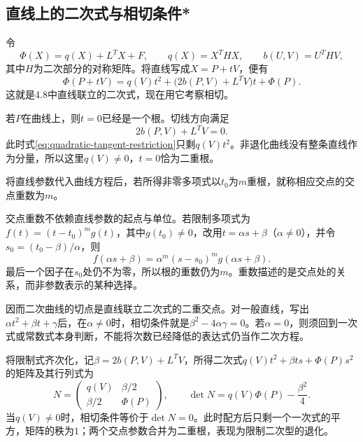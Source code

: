 \newpage
\subsection{直线上的二次式与相切条件*}
\label{subsec:quadratic-tangency-and-quadratic-forms}

令
\begin{equation*}
 \Phi(X)=q(X)+L^TX+F,\qquad q(X)=X^THX,\qquad b(U,V)=U^THV,
\end{equation*}
其中\(H\)为二次部分的对称矩阵。将直线写成\(X=P+tV\)，便有
\begin{equation}\label{eq:quadratic-tangent-restriction}
 \Phi(P+tV)=q(V)t^2+\bigl(2b(P,V)+L^TV\bigr)t+\Phi(P).
\end{equation}
这就是4.8中直线联立的二次式，现在用它考察相切。

若\(P\)在曲线上，则\(t=0\)已经是一个根。切线方向满足
\begin{equation}\label{eq:quadratic-tangent-direction-bilinear}
 2b(P,V)+L^TV=0.
\end{equation}
此时式\eqref{eq:quadratic-tangent-restriction}只剩\(q(V)t^2\)。非退化曲线没有整条直线作为分量，所以这里\(q(V)\ne0\)，\(t=0\)恰为二重根。

\begin{definition}
将直线参数代入曲线方程后，若所得非零多项式以\(t_0\)为\(m\)重根，就称相应交点的{\heiti{}交点重数}为\(m\)。
\end{definition}

交点重数不依赖直线参数的起点与单位。若限制多项式为\(f(t)=(t-t_0)^mg(t)\)，其中\(g(t_0)\ne0\)，改用\(t=\alpha s+\beta\)（\(\alpha\ne0\)），并令\(s_0=(t_0-\beta)/\alpha\)，则
\begin{equation*}
 f(\alpha s+\beta)=\alpha^m(s-s_0)^m g(\alpha s+\beta).
\end{equation*}
最后一个因子在\(s_0\)处仍不为零，所以根的重数仍为\(m\)。重数描述的是交点处的关系，而非参数表示的某种选择。

因而二次曲线的切点是直线联立二次式的二重交点。对一般直线，写出\(\alpha t^2+\beta t+\gamma\)后，在\(\alpha\ne0\)时，相切条件就是\(\beta^2-4\alpha\gamma=0\)。若\(\alpha=0\)，则须回到一次式或常数式本身判断，不能将次数已经降低的表达式仍当作二次方程。

将限制式齐次化，记\(\beta=2b(P,V)+L^TV\)，所得二次式\(q(V)t^2+\beta ts+\Phi(P)s^2\)的矩阵及其行列式为
\begin{equation*}
 N=\begin{pmatrix}q(V)&\beta/2\\\beta/2&\Phi(P)\end{pmatrix},
 \qquad \det N=q(V)\Phi(P)-\frac{\beta^2}{4}.
\end{equation*}
当\(q(V)\ne0\)时，相切条件等价于\(\det N=0\)。此时配方后只剩一个一次式的平方，矩阵的秩为\(1\)；两个交点参数合并为二重根，表现为限制二次型的退化。

